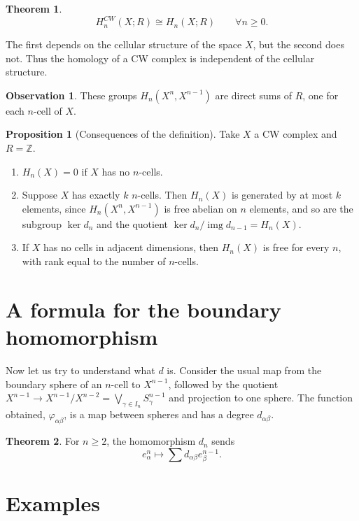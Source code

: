 \documentclass{book}
\theoremstyle{definition}
\newtheorem*{obs}{Observation}
\newtheorem*{teo}{Theorem}
\newtheorem*{prop}{Proposition}
\newcommand{\Z}{\mathbb{Z}}
\DeclareMathOperator{\img}{img}
\begin{document}
\begin{teo}
$$
H_n^{CW}(X;R)\cong H_n(X;R)
\qquad\forall n\geq0.
$$
\end{teo}

The first depends on the cellular structure of the space $X$,
but the second does not. Thus the homology of a CW complex is
independent of the cellular structure.

\begin{obs}\label{obs1}
These groups $H_n(X^n,X^{n-1})$ are direct sums of $R$, one
for each $n$-cell of $X$.
\end{obs}

\begin{prop}[Consequences of the definition]
Take $X$ a CW complex and $R=\Z$.
\begin{enumerate}
\item $H_n(X)=0$ if $X$ has no $n$-cells.
\item Suppose $X$ has exactly $k$ $n$-cells. Then $H_n(X)$ is
generated by at most $k$ elements, since
$H_n(X^n,X^{n-1})$ is free abelian on $n$ elements, and so
are the subgroup $\ker d_n$ and the quotient
$\ker d_n/\img d_{n-1}=H_n(X)$.
\item If $X$ has no cells in adjacent dimensions, then
$H_n(X)$ is free for every $n$, with rank equal to the number
of $n$-cells.
\end{enumerate}
\end{prop}

\section{A formula for the boundary homomorphism}

Now let us try to understand what $d$ is. Consider the usual
map from the boundary sphere of an $n$-cell to
$X^{n-1}$, followed by the quotient
$X^{n-1}\to X^{n-1}/X^{n-2}=\bigvee_{\gamma\in I_n}S^{n-1}_\gamma$
and projection to one sphere. The function obtained,
$\varphi_{\alpha\beta}$, is a map between spheres and has a
degree $d_{\alpha\beta}$.

\begin{teo}
For $n\geq2$, the homomorphism $d_n$ sends
$$
e^n_\alpha\mapsto\sum d_{\alpha\beta}e^{n-1}_\beta.
$$
\end{teo}


\section{Examples}
\end{document}
